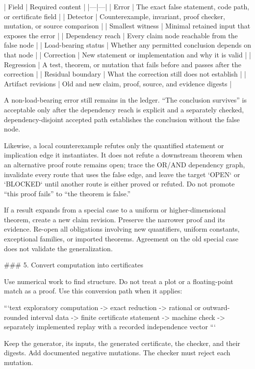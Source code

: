 \documentclass[11pt]{article}
\begin{document}
\begin{markdown}
| Field | Required content |
|---|---|
| Error | The exact false statement, code path, or certificate field |
| Detector | Counterexample, invariant, proof checker, mutation, or source comparison |
| Smallest witness | Minimal retained input that exposes the error |
| Dependency reach | Every claim node reachable from the false node |
| Load-bearing status | Whether any permitted conclusion depends on that node |
| Correction | New statement or implementation and why it is valid |
| Regression | A test, theorem, or mutation that fails before and passes after the correction |
| Residual boundary | What the correction still does not establish |
| Artifact revisions | Old and new claim, proof, source, and evidence digests |

A non-load-bearing error still remains in the ledger. “The conclusion survives” is acceptable only
after the dependency reach is explicit and a separately checked, dependency-disjoint accepted path
establishes the conclusion without the false node.

Likewise, a local counterexample refutes only the quantified statement or implication edge it
instantiates. It does not refute a downstream theorem when an alternative proof route remains open;
trace the OR/AND dependency graph, invalidate every route that uses the false edge, and leave the
target `OPEN` or `BLOCKED` until another route is either proved or refuted. Do not promote “this
proof fails” to “the theorem is false.”

If a result expands from a special case to a uniform or higher-dimensional theorem, create a new
claim revision. Preserve the narrower proof and its evidence. Re-open all obligations involving
new quantifiers, uniform constants, exceptional families, or imported theorems. Agreement on the
old special case does not validate the generalization.

### 5. Convert computation into certificates

Use numerical work to find structure. Do not treat a plot or a floating-point match as a proof.
Use this conversion path when it applies:

```text
exploratory computation
    -> exact reduction
    -> rational or outward-rounded interval data
    -> finite certificate statement
    -> machine check
    -> separately implemented replay with a recorded independence vector
```

Keep the generator, its inputs, the generated certificate, the checker, and their digests. Add
documented negative mutations. The checker must reject each mutation.


\end{markdown}
\end{document}
